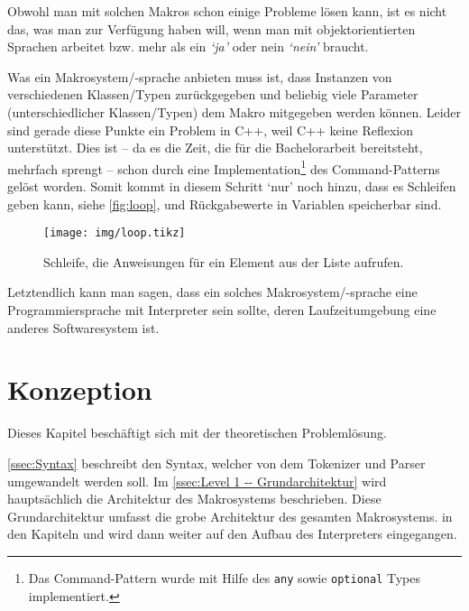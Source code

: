     Obwohl man mit solchen Makros schon einige Probleme lösen kann, ist es nicht das, was man zur Verfügung haben will, wenn man mit objektorientierten Sprachen arbeitet bzw. mehr als ein \textit{`ja'} oder nein \textit{`nein'} braucht.

    Was ein Makrosystem/-sprache anbieten muss ist, dass Instanzen von verschiedenen Klassen/Typen zurückgegeben und beliebig viele Parameter (unterschiedlicher Klassen/Typen) dem Makro mitgegeben werden können. Leider sind gerade diese Punkte ein Problem in C++, weil C++ keine Reflexion\autocites{vinoski2005time}{ferber1989computational} unterstützt. Dies ist -- da es die Zeit, die für die Bachelorarbeit bereitsteht, mehrfach sprengt -- schon durch eine Implementation\footnote{%
      Das Command-Pattern wurde mit Hilfe des \texttt{any}
      sowie \texttt{optional}
      Types implementiert.
    }\spewnotes{}
    des Command-Patterns gelöst worden. Somit kommt in diesem Schritt `nur' noch hinzu, dass es Schleifen geben kann, siehe \autoref{fig:loop}, und Rückgabewerte in Variablen speicherbar sind.

    \begin{figure}[H]
      \centering
      \texttt{[image: img/loop.tikz]}
      \caption{Schleife, die Anweisungen für ein Element aus der Liste aufrufen.}
      \label{fig:loop}
    \end{figure}

    Letztendlich kann man sagen, dass ein solches Makrosystem/-sprache eine Programmiersprache mit Interpreter sein sollte, deren Laufzeitumgebung eine anderes Softwaresystem ist.

\section{Konzeption}
\label{sec:Konzeption}
  Dieses Kapitel beschäftigt sich mit der theoretischen Problemlösung.

  \autoref{ssec:Syntax} beschreibt den Syntax, welcher von dem Tokenizer und Parser umgewandelt werden soll. Im \autoref{ssec:Level 1 -- Grundarchitektur} wird hauptsächlich die Architektur des Makrosystems beschrieben. Diese Grundarchitektur umfasst die grobe Architektur des gesamten Makrosystems. in den Kapiteln  und 
  wird dann weiter auf den Aufbau des Interpreters eingegangen.

